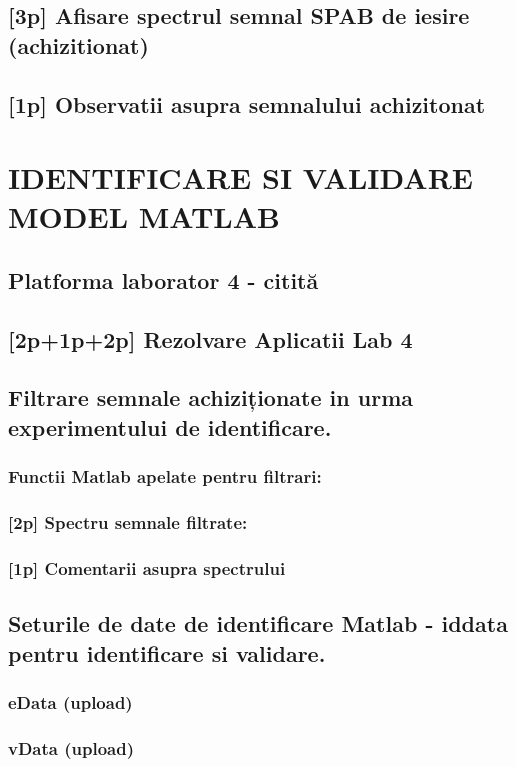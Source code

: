 \documentclass[12pt,english]{article}
\begin{document}
\subsection { [3p] Afisare spectrul semnal SPAB de iesire (achizitionat) }
\subsection { [1p] Observatii asupra semnalului achizitonat }

\section { IDENTIFICARE SI VALIDARE MODEL MATLAB }
\subsection { Platforma laborator 4 - citită                                  }
\subsection { [2p+1p+2p] Rezolvare Aplicatii Lab 4 }
\subsection { Filtrare semnale achiziționate in urma experimentului de identificare. }
\subsubsection { Functii Matlab apelate pentru filtrari: }
\subsubsection { [2p] Spectru semnale filtrate: }
\subsubsection { [1p] Comentarii asupra spectrului }
\subsection { Seturile de date de identificare Matlab - iddata pentru identificare si validare. }
\subsubsection { eData  (upload) }
\subsubsection { vData  (upload) }
\end{document}
